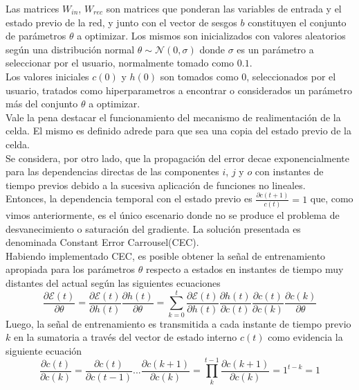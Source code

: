 \documentclass{article}
\begin{document}
	Las matrices $W_{in}$, $W_{rec}$ son matrices que ponderan las variables de entrada y el estado previo de la red, y junto con el vector de sesgos $b$ constituyen el conjunto de parámetros $\theta$ a optimizar. Los mismos son inicializados con valores aleatorios según una distribución normal $\theta \sim \mathcal{N}(0,\sigma)$ donde $\sigma$ es un parámetro a seleccionar por el usuario, normalmente tomado como $0.1$.\\
	Los valores iniciales $c(0)$ y $h(0)$ son tomados como $0$, seleccionados por el usuario, tratados como hiperparametros a encontrar o considerados un parámetro más del conjunto $\theta$ a optimizar.\\
	
	Vale la pena destacar el funcionamiento del mecanismo de realimentación de la celda. El mismo es definido adrede para que sea una copia del estado previo de la celda. \\
	Se considera, por otro lado, que la propagación del error decae exponencialmente para las dependencias directas de las componentes $i$, $j$ y $o$ con instantes de tiempo previos debido a la sucesiva aplicación de funciones no lineales\cite{25DependenciesProblemHochreiter}.\\
	Entonces, la dependencia temporal con el estado previo es $\frac{\partial c(t+1)}{c(t)} = 1$ que, como vimos anteriormente, es el único escenario donde no se produce el problema de desvanecimiento o saturación del gradiente. La solución presentada es denominada Constant Error Carrousel(CEC).\\
	Habiendo implementado CEC, es posible obtener la señal de entrenamiento apropiada para los parámetros $\theta$ respecto a estados en instantes de tiempo muy distantes del actual según las siguientes ecuaciones
	\begin{equation}\label{temporalDependenceLSTM}
	\dfrac{\partial \mathcal{E}(t)}{\partial \theta} = \dfrac{\partial \mathcal{E}(t)}{\partial h(t)} \dfrac{\partial h(t)}{\partial \theta} =\sum_{k=0}^{t} \dfrac{\partial \mathcal{E}(t)}{\partial h(t)} \dfrac{\partial h(t)}{\partial c(t)}\dfrac{\partial c(t)}{\partial c(k)}\dfrac{\partial c(k)}{\partial \theta}
	\end{equation}
	Luego, la señal de entrenamiento es transmitida a cada instante de tiempo previo $k$ en la sumatoria a través del vector de estado interno $c(t)$ como evidencia la siguiente ecuación
	\begin{equation}\label{expandedCEC}
	\dfrac{\partial c(t)}{\partial c(k)} = \dfrac{\partial c(t)}{\partial c(t-1)} ... \dfrac{\partial c(k+1)}{\partial c(k)} = \prod_{k}^{t-1} \dfrac{\partial c(k+1)}{\partial c(k)} = 1^{t-k} = 1
	\end{equation}
\end{document}
